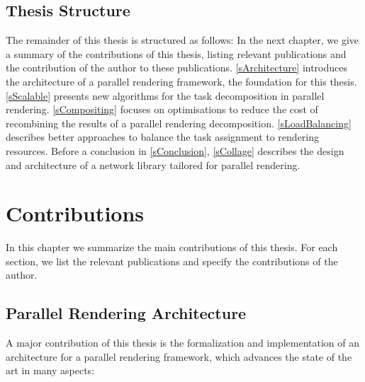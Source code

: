 \section{Thesis Structure}

The remainder of this thesis is structured as follows: In the next chapter, we
give a summary of the contributions of this thesis, listing relevant
publications and the contribution of the author to these publications.
\cref{sArchitecture} introduces the architecture of a parallel rendering
framework, the foundation for this thesis. \cref{sScalable} presents new
algorithms for the task decomposition in parallel rendering. \cref{sCompositing}
focuses on optimisations to reduce the cost of recombining the results of a
parallel rendering decomposition. \cref{sLoadBalancing} describes better
approaches to balance the task assignment to rendering resources. Before a
conclusion in \cref{sConclusion}, \cref{sCollage} describes the design and
architecture of a network library tailored for parallel rendering.


\chapter{Contributions}

In this chapter we summarize the main contributions of this thesis. For each
section, we list the relevant publications and specify the contributions of the
author.

\section{Parallel Rendering Architecture}

A major contribution of this thesis is the formalization and implementation of
an architecture for a parallel rendering framework, which advances the state of
the art in many aspects:

